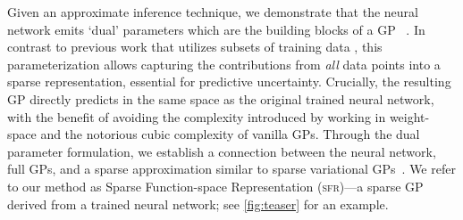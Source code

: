 \documentclass{article}
\makeatletter
\newcommand{\ie}{\textit{i.e.\@}\xspace}
\newcommand{\our}{\textsc{sfr}\xspace}
\makeatother
\begin{document}
Given an approximate inference technique, we demonstrate that the neural network emits `dual' parameters which are the building blocks of a GP~\citep{csato2002sparse, adam2021dual, chang2023memory} . In contrast to previous work that utilizes subsets of training data \citep{immer2021scalable}, this parameterization allows capturing the contributions from {\em all} data points into a sparse representation, essential for predictive uncertainty. Crucially, the resulting GP directly predicts in the same space as the original trained neural network, with the benefit of avoiding the complexity introduced by working in weight-space and the notorious cubic complexity of vanilla GPs.
Through the dual parameter formulation, we establish a connection between the neural network, full GPs, and a sparse approximation similar to sparse variational GPs~\citep{titsias2009variational}. We refer to our method as Sparse Function-space Representation (\our)---a sparse GP derived from a trained neural network; see \cref{fig:teaser} for an example. %
\end{document}
